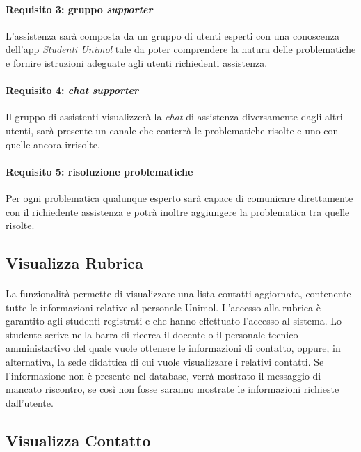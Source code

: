 \paragraph{Requisito 3: gruppo \emph{supporter}\\}
L’assistenza sarà composta da un gruppo di utenti esperti con una conoscenza dell’app \emph{Studenti Unimol} tale da poter comprendere la natura delle problematiche e fornire istruzioni adeguate agli utenti richiedenti assistenza. 

\paragraph{Requisito 4: \emph{chat} \emph{supporter}\\}
Il gruppo di assistenti visualizzerà la \emph{chat} di assistenza diversamente dagli altri utenti, sarà presente un canale che conterrà le problematiche risolte e uno con quelle ancora irrisolte.

\paragraph{Requisito 5: risoluzione problematiche\\}
Per ogni problematica qualunque esperto sarà capace di comunicare direttamente con il richiedente assistenza e potrà inoltre aggiungere la problematica tra quelle risolte. 

\subsection{Visualizza Rubrica}
\paragraph{}
La funzionalità permette di visualizzare una lista contatti aggiornata, contenente tutte le informazioni relative al personale Unimol. L’accesso alla rubrica è garantito agli studenti
registrati e che hanno effettuato l'accesso al sistema.
Lo studente scrive nella barra di ricerca il docente o il personale tecnico-amministartivo del quale vuole ottenere le informazioni di contatto, oppure, in alternativa, la sede didattica di cui vuole visualizzare i relativi contatti.
Se l'informazione non è presente nel database, verrà mostrato
il messaggio di mancato riscontro, se così non fosse saranno
mostrate le informazioni richieste dall'utente.

\subsection{Visualizza Contatto}
